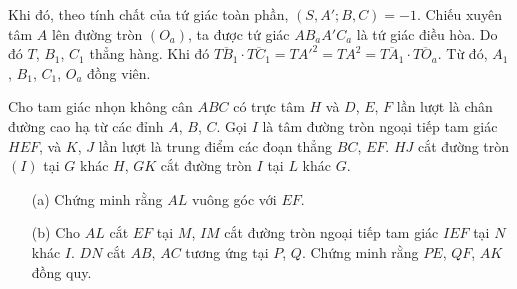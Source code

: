 \begin{solution}
\begin{enumerate}
            Khi đó, theo tính chất của tứ giác toàn phần, \((S,A';B,C) = -1\). Chiếu xuyên tâm \(A\) lên đường tròn \((O_a)\), ta được tứ giác \(AB_aA'C_a\) là tứ giác điều hòa. Do đó \(T\), \(B_1\), \(C_1\) thẳng hàng. Khi đó \(\overline{TB_1} \cdot \overline{TC_1} = TA'^2 = TA^2 = \overline{TA_1} \cdot \overline{TO_a}\). Từ đó, \(A_1\), \(B_1\), \(C_1\), \(O_a\) đồng viên.
        \end{enumerate}
    \end{solution}

    \begin{problem}
        Cho tam giác nhọn không cân \(ABC\) có trực tâm \(H\) và \(D\), \(E\), \(F\) lần lượt là chân đường cao hạ từ các đỉnh \(A\), \(B\), \(C\). Gọi \(I\) là tâm đường tròn ngoại tiếp tam giác \(HEF\), và \(K\), \(J\) lần lượt là trung điểm các đoạn thẳng \(BC\), \(EF\). \(HJ\) cắt đường tròn \((I)\) tại \(G\) khác \(H\), \(GK\) cắt đường tròn \(I\) tại \(L\) khác \(G\).
        \begin{enumerate}
            \item[(a)] Chứng minh rằng \(AL\) vuông góc với \(EF\).
            \item[(b)] Cho \(AL\) cắt \(EF\) tại \(M\), \(IM\) cắt đường tròn ngoại tiếp tam giác \(IEF\) tại \(N\) khác \(I\). \(DN\) cắt \(AB\), \(AC\) tương ứng tại \(P\), \(Q\). Chứng minh rằng \(PE\), \(QF\), \(AK\) đồng quy.
        \end{enumerate}
    \end{problem}

